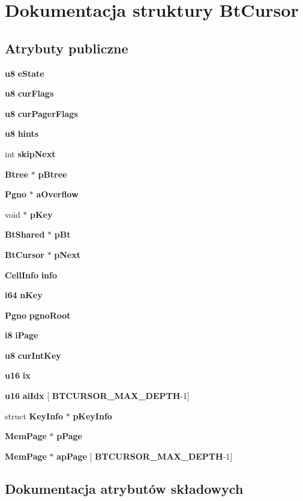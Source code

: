 \section{Dokumentacja struktury Bt\+Cursor}
\label{struct_bt_cursor}
\subsection*{Atrybuty publiczne}
\begin{DoxyCompactItemize}
\item 
\textbf{ u8} \textbf{ e\+State}
\item 
\textbf{ u8} \textbf{ cur\+Flags}
\item 
\textbf{ u8} \textbf{ cur\+Pager\+Flags}
\item 
\textbf{ u8} \textbf{ hints}
\item 
int \textbf{ skip\+Next}
\item 
\textbf{ Btree} $\ast$ \textbf{ p\+Btree}
\item 
\textbf{ Pgno} $\ast$ \textbf{ a\+Overflow}
\item 
void $\ast$ \textbf{ p\+Key}
\item 
\textbf{ Bt\+Shared} $\ast$ \textbf{ p\+Bt}
\item 
\textbf{ Bt\+Cursor} $\ast$ \textbf{ p\+Next}
\item 
\textbf{ Cell\+Info} \textbf{ info}
\item 
\textbf{ i64} \textbf{ n\+Key}
\item 
\textbf{ Pgno} \textbf{ pgno\+Root}
\item 
\textbf{ i8} \textbf{ i\+Page}
\item 
\textbf{ u8} \textbf{ cur\+Int\+Key}
\item 
\textbf{ u16} \textbf{ ix}
\item 
\textbf{ u16} \textbf{ ai\+Idx} [\textbf{ B\+T\+C\+U\+R\+S\+O\+R\+\_\+\+M\+A\+X\+\_\+\+D\+E\+P\+TH}-\/1]
\item 
struct \textbf{ Key\+Info} $\ast$ \textbf{ p\+Key\+Info}
\item 
\textbf{ Mem\+Page} $\ast$ \textbf{ p\+Page}
\item 
\textbf{ Mem\+Page} $\ast$ \textbf{ ap\+Page} [\textbf{ B\+T\+C\+U\+R\+S\+O\+R\+\_\+\+M\+A\+X\+\_\+\+D\+E\+P\+TH}-\/1]
\end{DoxyCompactItemize}


\subsection{Dokumentacja atrybutów składowych}
\mbox{\label{struct_bt_cursor_a61992c656430b08c77c002302aa3d8d1}} 
